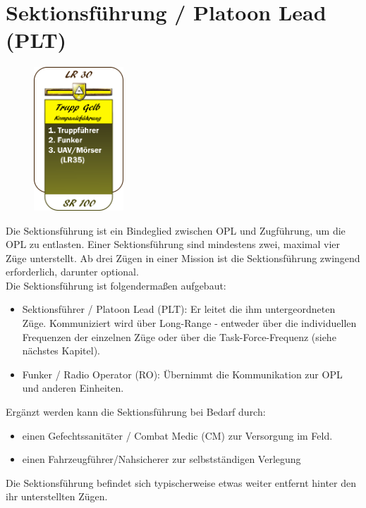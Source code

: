\section{Sektionsführung / Platoon Lead (PLT)}
\begin{figure}
	\centering 
	\includegraphics[width=0.3\textwidth]{./img/truppenordnung/sektionsfuehrung/sektionsfuehrung.png}
\end{figure}	
Die Sektionsführung ist ein Bindeglied zwischen OPL und Zugführung, um die OPL zu entlasten. Einer Sektionsführung sind mindestens zwei, maximal vier Züge unterstellt. Ab drei Zügen in einer Mission ist die Sektionsführung zwingend erforderlich, darunter optional.\\
Die Sektionsführung ist folgendermaßen aufgebaut:
\begin{itemize}
	\item Sektionsführer / Platoon Lead (PLT): Er leitet die ihm untergeordneten Züge. Kommuniziert wird über Long-Range - entweder über die individuellen Frequenzen der einzelnen Züge oder über die Task-Force-Frequenz (siehe nächstes Kapitel).
	\item Funker / Radio Operator (RO): Übernimmt die Kommunikation zur OPL und anderen Einheiten.
\end{itemize}
Ergänzt werden kann die Sektionsführung bei Bedarf durch:
\begin{itemize}
	\setlength\itemsep{0em}
	\item einen Gefechtssanitäter / Combat Medic (CM) zur Versorgung im Feld.
	\item einen Fahrzeugführer/Nahsicherer zur selbstständigen Verlegung
\end{itemize} 
Die Sektionsführung befindet sich typischerweise etwas weiter entfernt hinter den ihr unterstellten Zügen.
